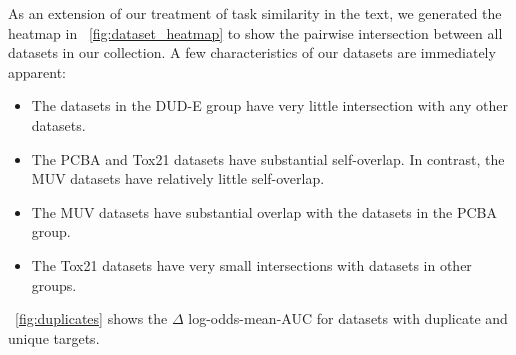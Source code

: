 As an extension of our treatment of task similarity in the text, we generated the heatmap in \figurename~\ref{fig:dataset_heatmap} to show the pairwise intersection between all datasets in our collection. A few characteristics of our datasets are immediately apparent: \begin{itemize} 
\item The datasets in the DUD-E group have very little intersection with any other datasets.
\item The PCBA and Tox21 datasets have substantial
self-overlap. In contrast, the MUV datasets have relatively little
self-overlap.  \item The MUV datasets have substantial overlap with the
datasets in the PCBA group.  \item The Tox21 datasets have very small
intersections with datasets in other groups.  \end{itemize}

\figurename~\ref{fig:duplicates} shows the $\Delta$ log-odds-mean-AUC for
datasets with duplicate and unique targets.


